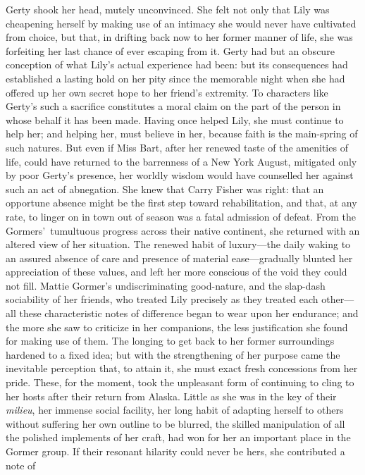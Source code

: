 \documentclass[12pt,a4paper]{book}
\begin{document}
Gerty shook her head, mutely unconvinced. She felt not only that
Lily was cheapening herself by making use of an intimacy she
would never have cultivated from choice, but that, in drifting
back now to her former manner of life, she was forfeiting her
last chance of ever escaping from it. Gerty had but an obscure
conception of what Lily's actual experience had been: but its
consequences had established a lasting hold on her pity since the
memorable night when she had offered up her own secret hope to
her friend's extremity. To characters like Gerty's such a
sacrifice constitutes a moral claim on the part of the person in
whose behalf it has been made. Having once helped Lily, she must
continue to help her; and helping her, must believe in her,
because faith is the main-spring of such natures. But even if
Miss Bart, after her renewed taste of the amenities of life,
could have returned to the barrenness of a New York August,
mitigated only by poor Gerty's presence, her worldly wisdom would
have counselled her against such an act of abnegation. She knew
that Carry Fisher was right: that an opportune absence might be
the first step toward rehabilitation, and that, at any rate, to
linger on in town out of season was a fatal admission of defeat. 
From the Gormers'\ tumultuous progress across their native
continent, she returned with an altered view of her situation. 
The renewed habit of luxury---the daily waking to an assured
absence of care and presence of material ease---gradually blunted
her appreciation of these values, and left her more conscious of
the void they could not fill. Mattie Gormer's undiscriminating
good-nature, and the slap-dash sociability of her friends, who
treated Lily precisely as they treated each other---all these
characteristic notes of difference began to wear upon her
endurance; and the more she saw to criticize in her companions,
the less justification she found for making use of them. The
longing to get back to her former surroundings hardened to a
fixed idea; but with the strengthening of her purpose came the
inevitable perception that, to attain it, she must exact fresh
concessions from her pride. These, for the moment, took the
unpleasant form of continuing to cling to her hosts after their
return from Alaska. Little as she was in the key of their \textit{milieu},
her immense social facility, her long habit of adapting herself
to others without suffering her own outline to be blurred, the
skilled manipulation of all the polished implements of her craft,
had won for her an important place in the Gormer group. If their
resonant hilarity could never be hers, she contributed a note of
\end{document}
